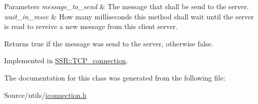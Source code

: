 \begin{DoxyParams}{Parameters}
{\em message\-\_\-to\-\_\-send} & The message that shall be send to the server.\\
\hline
{\em wait\-\_\-in\-\_\-msec} & How many milliseconds this method shall wait until the server is read to reveive a new message from this client server.\\
\hline
\end{DoxyParams}
\begin{DoxyReturn}{Returns}
true if the message was send to the server, otherwise false. 
\end{DoxyReturn}


Implemented in \hyperlink{classSSR_1_1TCP__connection_a5ac5568c97d926507c4455daf7304ec4}{S\-S\-R\-::\-T\-C\-P\-\_\-connection}.



The documentation for this class was generated from the following file\-:\begin{DoxyCompactItemize}
\item 
Source/utils/\hyperlink{iconnection_8h}{iconnection.\-h}\end{DoxyCompactItemize}
